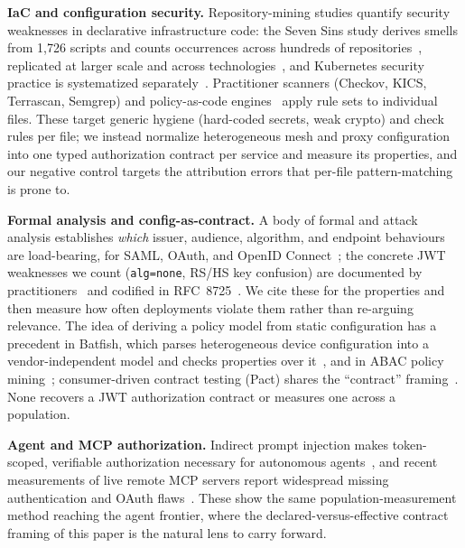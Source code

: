 \noindent\textbf{IaC and configuration security.} Repository-mining studies quantify
security weaknesses in declarative infrastructure code: the Seven Sins study derives
smells from 1{,}726 scripts and counts occurrences across hundreds of
repositories~\cite{authzmeas2019sevensins}, replicated at larger scale and across
technologies~\cite{authzmeas2021iacreplication,authzmeas2022glitch}, and Kubernetes
security practice is systematized separately~\cite{authzmeas2020k8scommandments}.
Practitioner scanners (Checkov, KICS, Terrascan, Semgrep) and policy-as-code
engines~\cite{authzmeas2024checkov,authzmeas2024kics,authzmeas2024terrascan,authzmeas2024semgrep,authzmeas2024opa}
apply rule sets to individual files. These target generic hygiene (hard-coded
secrets, weak crypto) and check rules per file; we instead normalize heterogeneous
mesh and proxy configuration into one typed authorization contract per service and
measure its properties, and our negative control targets the attribution errors that
per-file pattern-matching is prone to.

\noindent\textbf{Formal analysis and config-as-contract.} A body of formal and
attack analysis establishes \emph{which} issuer, audience, algorithm, and endpoint
behaviours are load-bearing, for SAML, OAuth, and OpenID
Connect~\cite{authzmeas2008samlsso,authzmeas2012websanalysis,authzmeas2016oauthformal,authzmeas2017oidcformal};
the concrete JWT weaknesses we count (\texttt{alg=none}, RS/HS key confusion) are
documented by practitioners~\cite{authzmeas2015jwtlibs,authzmeas2024portswiggerjwt}
and codified in RFC~8725~\cite{rfc8725}. We cite these for the properties and then
measure how often deployments violate them rather than re-arguing relevance. The
idea of deriving a policy model from static configuration has a precedent in Batfish,
which parses heterogeneous device configuration into a vendor-independent model and
checks properties over it~\cite{authzmeas2015batfish}, and in ABAC policy
mining~\cite{authzmeas2015abacmining}; consumer-driven contract testing (Pact) shares
the ``contract'' framing~\cite{authzmeas2024pact}. None recovers a JWT authorization
contract or measures one across a population.

\noindent\textbf{Agent and MCP authorization.} Indirect prompt injection makes
token-scoped, verifiable authorization necessary for autonomous
agents~\cite{authzmeas2023promptinjection}, and recent measurements of live remote
MCP servers report widespread missing authentication and OAuth
flaws~\cite{authzmeas2026mcpauthmeas,authzmeas2026mcpexposed}. These show the same
population-measurement method reaching the agent frontier, where the declared-versus-effective
contract framing of this paper is the natural lens to carry forward.

